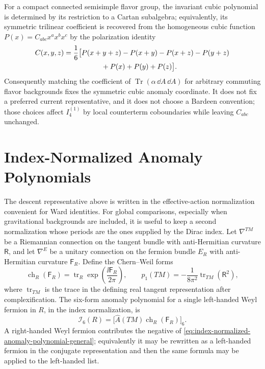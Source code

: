 For a compact connected semisimple flavor group, the invariant cubic
polynomial is determined by its restriction to a Cartan subalgebra; equivalently,
its symmetric trilinear coefficient is recovered from the homogeneous cubic
function \(P(x)=C_{abc}x^ax^bx^c\) by the polarization identity
\begin{equation}
\begin{aligned}
  C(x,y,z)
  =
  \frac16\bigl[
    &P(x+y+z)-P(x+y)-P(x+z)-P(y+z)
\\
    &\hspace{2.8em}+P(x)+P(y)+P(z)
  \bigr].
\end{aligned}
  \label{eq:cubic-polarization-identity-for-anomaly-coordinate}
\end{equation}
Consequently matching the coefficient of
\(\operatorname{Tr}(\alpha\,\dd A\,\dd A)\) for arbitrary commuting flavor
backgrounds fixes the symmetric cubic anomaly coordinate.  It does not fix a
preferred current representative, and it does not choose a Bardeen convention;
those choices affect \(I_4^{(1)}\) by local counterterm coboundaries while
leaving \(C_{abc}\) unchanged.

\section{Index-Normalized Anomaly Polynomials}
\label{sec:index-normalized-anomaly-polynomials}

The descent representative above is written in the effective-action
normalization convenient for Ward identities.  For global comparisons,
especially when gravitational backgrounds are included, it is useful to keep a
second normalization whose periods are the ones supplied by the Dirac index.
Let \(\nabla^{TM}\) be a Riemannian connection on the tangent bundle with
anti-Hermitian curvature \(\mathsf R\), and let
\(\nabla^E\) be a unitary connection on the fermion bundle \(E_R\) with
anti-Hermitian curvature \(\mathsf F_R\).  Define the Chern--Weil forms
\begin{equation}
  \operatorname{ch}_R(\mathsf F_R)
  =
  \operatorname{tr}_R
  \exp\!\left(\frac{\ii\mathsf F_R}{2\pi}\right),
  \qquad
  p_1(TM)
  =
  -\frac1{8\pi^2}
  \operatorname{tr}_{TM}(\mathsf R^2),
  \label{eq:index-normalized-chern-pontryagin}
\end{equation}
where \(\operatorname{tr}_{TM}\) is the trace in the defining real tangent
representation after complexification.  The six-form anomaly polynomial for a
single left-handed Weyl fermion in \(R\), in the index normalization, is
\begin{equation}
  \mathcal I_6(R)
  =
  \bigl[
    \widehat A(TM)\operatorname{ch}_R(\mathsf F_R)
  \bigr]_6 .
  \label{eq:index-normalized-anomaly-polynomial-general}
\end{equation}
A right-handed Weyl fermion contributes the negative of
\eqref{eq:index-normalized-anomaly-polynomial-general}; equivalently it may be
rewritten as a left-handed fermion in the conjugate representation and then
the same formula may be applied to the left-handed list.

